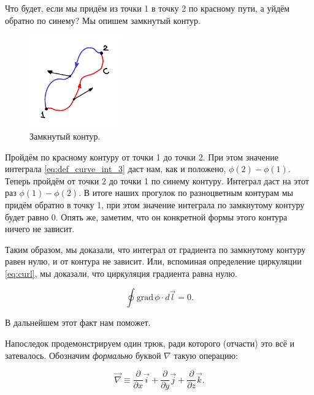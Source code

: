 \documentclass[12pt,a4paper]{article}
\numberwithin{equation}{section}
\numberwithin{equation}{section}
\newcommand{\pt}{\partial}
\newcommand{\grad}{\mathrm{grad}\,}
\begin{document}
Что будет, если мы придём из точки 1 в точку 2 по красному пути, а
уйдём обратно по синему? Мы опишем замкнутый контур. 

\begin{figure}
  \vspace{-0.75cm}
  \begin{center}
    \includegraphics[width=4cm,height=4cm]{path_indep.pdf}
  \end{center}
  \vspace{-0.7cm}
  \caption{Замкнутый контур.}
  \label{fig:path_indep}
\end{figure}

Пройдём по красному контуру от точки 1 до точки 2. При этом значение
интеграла \eqref{eq:def_curve_int_3} даст нам, как и положено, $\phi(2)
- \phi(1)$. Теперь пройдём от точки 2 до точки 1 по синему
контуру. Интеграл даст на этот раз $\phi(1) - \phi(2)$. В итоге наших
прогулок по разноцветным контурам мы придём обратно в точку 1, при
этом значение интеграла по замкнутому контуру будет равно 0. Опять же,
заметим, что он конкретной формы этого контура ничего не зависит. 

Таким образом, мы доказали, что интеграл от градиента по замкнутому
контуру равен нулю, и от контура не зависит. Или, вспоминая
определение циркуляции \eqref{eq:curl}, мы доказали, что циркуляция
градиента равна нулю.

\begin{equation}
  \label{eq:int_grad}
  \oint \grad \phi \cdot  d\vec{l} =0.
\end{equation}

В дальнейшем этот факт нам поможет. 

Напоследок продемонстрируем один трюк, ради которого (отчасти) это всё
и затевалось. Обозначим \emph{формально} буквой $\nabla$ такую
операцию:

\begin{equation}
  \label{eq:def_nabla}
  \vec{\nabla} \equiv \frac{\pt}{\pt x} \vec{i} +  \frac{\pt}{\pt y}
  \vec{j} +  \frac{\pt}{\pt z} \vec{k}.
\end{equation}
\end{document}
